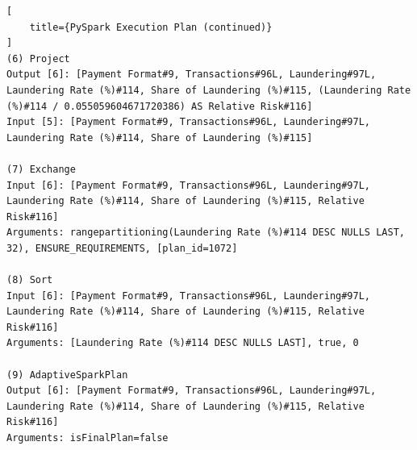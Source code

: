 \newpage

\begin{lstlisting}[
    title={PySpark Execution Plan (continued)}
]
(6) Project
Output [6]: [Payment Format#9, Transactions#96L, Laundering#97L, Laundering Rate (%)#114, Share of Laundering (%)#115, (Laundering Rate (%)#114 / 0.055059604671720386) AS Relative Risk#116]
Input [5]: [Payment Format#9, Transactions#96L, Laundering#97L, Laundering Rate (%)#114, Share of Laundering (%)#115]

(7) Exchange
Input [6]: [Payment Format#9, Transactions#96L, Laundering#97L, Laundering Rate (%)#114, Share of Laundering (%)#115, Relative Risk#116]
Arguments: rangepartitioning(Laundering Rate (%)#114 DESC NULLS LAST, 32), ENSURE_REQUIREMENTS, [plan_id=1072]

(8) Sort
Input [6]: [Payment Format#9, Transactions#96L, Laundering#97L, Laundering Rate (%)#114, Share of Laundering (%)#115, Relative Risk#116]
Arguments: [Laundering Rate (%)#114 DESC NULLS LAST], true, 0

(9) AdaptiveSparkPlan
Output [6]: [Payment Format#9, Transactions#96L, Laundering#97L, Laundering Rate (%)#114, Share of Laundering (%)#115, Relative Risk#116]
Arguments: isFinalPlan=false
\end{lstlisting}